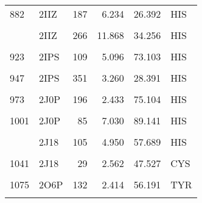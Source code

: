 \begin{table}
\begin{tabular}{llrrrl}
			882 & 2IIZ & 187 & 6.234 & 26.392 & HIS\\
			\cellcolor{gray!6}{888} & \cellcolor{gray!6}{2IIZ} & \cellcolor{gray!6}{224} & \cellcolor{gray!6}{2.426} & \cellcolor{gray!6}{61.464} & \cellcolor{gray!6}{HIS}\\
			\addlinespace
			903 & 2IIZ & 266 & 11.868 & 34.256 & HIS\\
			\cellcolor{gray!6}{908} & \cellcolor{gray!6}{2IIZ} & \cellcolor{gray!6}{272} & \cellcolor{gray!6}{11.141} & \cellcolor{gray!6}{87.103} & \cellcolor{gray!6}{HIS}\\
			923 & 2IPS & 109 & 5.096 & 73.103 & HIS\\
			\cellcolor{gray!6}{938} & \cellcolor{gray!6}{2IPS} & \cellcolor{gray!6}{312} & \cellcolor{gray!6}{8.997} & \cellcolor{gray!6}{60.684} & \cellcolor{gray!6}{TYR}\\
			947 & 2IPS & 351 & 3.260 & 28.391 & HIS\\
			\addlinespace
			\cellcolor{gray!6}{965} & \cellcolor{gray!6}{2IPS} & \cellcolor{gray!6}{444} & \cellcolor{gray!6}{5.609} & \cellcolor{gray!6}{58.367} & \cellcolor{gray!6}{HIS}\\
			973 & 2J0P & 196 & 2.433 & 75.104 & HIS\\
			\cellcolor{gray!6}{993} & \cellcolor{gray!6}{2J0P} & \cellcolor{gray!6}{318} & \cellcolor{gray!6}{0.747} & \cellcolor{gray!6}{79.570} & \cellcolor{gray!6}{TYR}\\
			1001 & 2J0P & 85 & 7.030 & 89.141 & HIS\\
			\cellcolor{gray!6}{1002} & \cellcolor{gray!6}{2J0P} & \cellcolor{gray!6}{89} & \cellcolor{gray!6}{9.449} & \cellcolor{gray!6}{71.784} & \cellcolor{gray!6}{HIS}\\
			\addlinespace
			1011 & 2J18 & 105 & 4.950 & 57.689 & HIS\\
			\cellcolor{gray!6}{1013} & \cellcolor{gray!6}{2J18} & \cellcolor{gray!6}{107} & \cellcolor{gray!6}{6.040} & \cellcolor{gray!6}{78.324} & \cellcolor{gray!6}{HIS}\\
			1041 & 2J18 & 29 & 2.562 & 47.527 & CYS\\
			\cellcolor{gray!6}{1071} & \cellcolor{gray!6}{2O6P} & \cellcolor{gray!6}{120} & \cellcolor{gray!6}{7.278} & \cellcolor{gray!6}{85.869} & \cellcolor{gray!6}{TYR}\\
			1075 & 2O6P & 132 & 2.414 & 56.191 & TYR\\
			\addlinespace
			\cellcolor{gray!6}{1076} & \cellcolor{gray!6}{2O6P} & \cellcolor{gray!6}{134} & \cellcolor{gray!6}{7.422} & \cellcolor{gray!6}{61.077} & \cellcolor{gray!6}{HIS}\\

\end{tabular}
\end{table}
